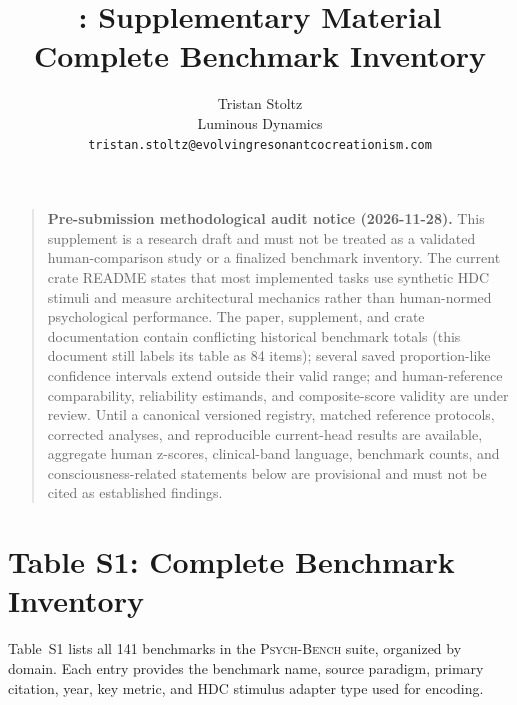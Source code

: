 \documentclass[10pt,landscape]{article}
\title{\psychbench{}: Supplementary Material\\
\large Complete Benchmark Inventory}
\author{Tristan Stoltz\\
Luminous Dynamics\\
\texttt{tristan.stoltz@evolvingresonantcocreationism.com}}
\date{}
\newcommand{\psychbench}{\textsc{Psych-Bench}}
\begin{document}
\maketitle

\begin{quote}
\textbf{Pre-submission methodological audit notice (2026-11-28).}
This supplement is a research draft and must not be treated as a validated
human-comparison study or a finalized benchmark inventory. The current crate
README states that most implemented tasks use synthetic HDC stimuli and measure
architectural mechanics rather than human-normed psychological performance.
The paper, supplement, and crate documentation contain conflicting historical
benchmark totals (this document still labels its table as 84 items); several saved proportion-like confidence intervals extend
outside their valid range; and human-reference comparability, reliability
estimands, and composite-score validity are under review. Until a canonical
versioned registry, matched reference protocols, corrected analyses, and
reproducible current-head results are available, aggregate human z-scores,
clinical-band language, benchmark counts, and consciousness-related statements
below are provisional and must not be cited as established findings.
\end{quote}


\section*{Table S1: Complete Benchmark Inventory}

Table~S1 lists all 141 benchmarks in the \psychbench{} suite, organized by domain. Each entry provides the benchmark name, source paradigm, primary citation, year, key metric, and HDC stimulus adapter type used for encoding.
\end{document}
